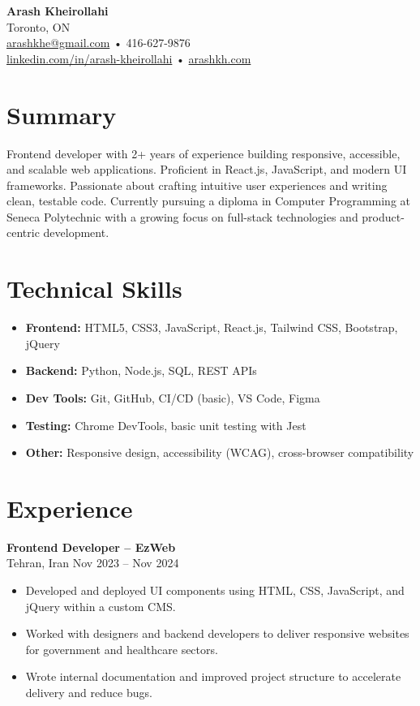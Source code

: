 \documentclass[letterpaper,11pt]{article}
\begin{document}

{\LARGE \textbf{Arash Kheirollahi}}\\[0.2em]
Toronto, ON \\
\href{mailto:arashkhe@gmail.com}{arashkhe@gmail.com} • 416-627-9876 \\
\href{https://linkedin.com/in/arash-kheirollahi}{linkedin.com/in/arash-kheirollahi} • \href{https://arashkh.com}{arashkh.com}

\vspace{0.8em}

\section*{Summary}
Frontend developer with 2+ years of experience building responsive, accessible, and scalable web applications. Proficient in React.js, JavaScript, and modern UI frameworks. Passionate about crafting intuitive user experiences and writing clean, testable code. Currently pursuing a diploma in Computer Programming at Seneca Polytechnic with a growing focus on full-stack technologies and product-centric development.

\section*{Technical Skills}
\begin{itemize}[leftmargin=*]
  \item \textbf{Frontend:} HTML5, CSS3, JavaScript, React.js, Tailwind CSS, Bootstrap, jQuery
  \item \textbf{Backend:} Python, Node.js, SQL, REST APIs
  \item \textbf{Dev Tools:} Git, GitHub, CI/CD (basic), VS Code, Figma
  \item \textbf{Testing:} Chrome DevTools, basic unit testing with Jest
  \item \textbf{Other:} Responsive design, accessibility (WCAG), cross-browser compatibility
\end{itemize}

\section*{Experience}
\textbf{Frontend Developer – EzWeb}\\
Tehran, Iran \hfill Nov 2023 -- Nov 2024
\begin{itemize}[leftmargin=*]
  \item Developed and deployed UI components using HTML, CSS, JavaScript, and jQuery within a custom CMS.
  \item Worked with designers and backend developers to deliver responsive websites for government and healthcare sectors.
  \item Wrote internal documentation and improved project structure to accelerate delivery and reduce bugs.
\end{itemize}
\end{document}
